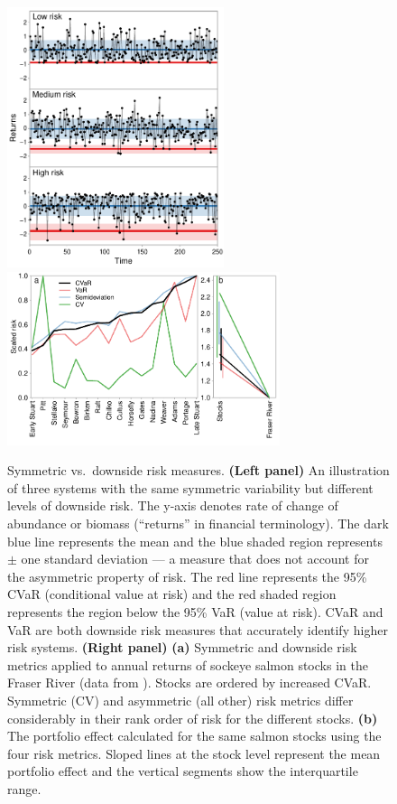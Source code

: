 \begin{figure}[htbp]
\centering
\includegraphics[height=3.0in]{skewness-abundance.pdf}
\includegraphics[height=2.0in]{compare-risk-and-portfolio-scale.pdf} \caption{
  Symmetric vs.\ downside risk measures. \textbf{(Left panel)} An illustration
  of three systems with the same symmetric variability but different levels of
  downside risk. The y-axis denotes rate of change of abundance or biomass
  (``returns'' in financial terminology). The dark blue line represents the
  mean and the blue shaded region represents $\pm$ one standard deviation --- a
  measure that does not account for the asymmetric property of risk. The red
  line represents the 95\% CVaR (conditional value at risk) and the red shaded
  region represents the region below the 95\% VaR (value at risk). CVaR and VaR
  are both downside risk measures that accurately identify higher risk systems.
  \textbf{(Right panel)} \textbf{(a)} Symmetric and downside risk metrics
  applied to annual returns of sockeye salmon stocks in the Fraser River (data
  from \citeauthor{dorner2008} \citeyear{dorner2008}). Stocks are ordered by
  increased CVaR. Symmetric (CV) and asymmetric (all other) risk metrics differ
  considerably in their rank order of risk for the different stocks.
  \textbf{(b)} The portfolio effect calculated for the same salmon stocks using
  the four risk metrics. Sloped lines at the stock level represent the mean
  portfolio effect and the vertical segments show the interquartile range.}
\label{fig:risk}
\end{figure}
